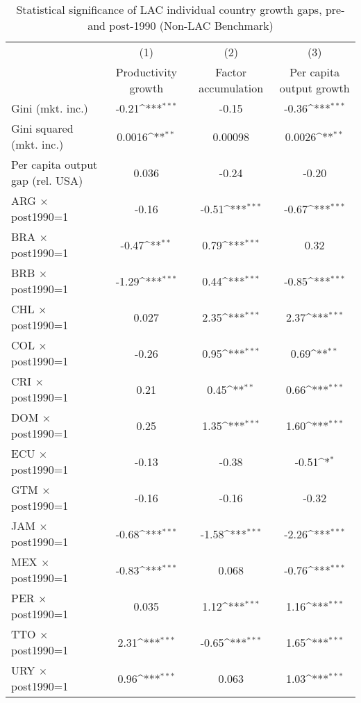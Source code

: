 \begin{table}[htbp]\centering
\def\sym#1{\ifmmode^{#1}\else\(^{#1}\)\fi}
\caption{Statistical significance of LAC individual country growth gaps, pre- and post-1990 (Non-LAC Benchmark)}
\begin{tabular}{l*{3}{c}}
\toprule
                &\multicolumn{1}{c}{(1)}&\multicolumn{1}{c}{(2)}&\multicolumn{1}{c}{(3)}\\
                &\multicolumn{1}{c}{Productivity growth}&\multicolumn{1}{c}{Factor accumulation}&\multicolumn{1}{c}{Per capita output growth}\\
\midrule
Gini (mkt. inc.)&    -0.21\sym{***}&    -0.15         &    -0.36\sym{***}\\
Gini squared (mkt. inc.)&   0.0016\sym{**} &  0.00098         &   0.0026\sym{**} \\
Per capita output gap (rel. USA)&    0.036         &    -0.24         &    -0.20         \\
ARG $\times$ post1990=1&    -0.16         &    -0.51\sym{***}&    -0.67\sym{***}\\
BRA $\times$ post1990=1&    -0.47\sym{**} &     0.79\sym{***}&     0.32         \\
BRB $\times$ post1990=1&    -1.29\sym{***}&     0.44\sym{***}&    -0.85\sym{***}\\
CHL $\times$ post1990=1&    0.027         &     2.35\sym{***}&     2.37\sym{***}\\
COL $\times$ post1990=1&    -0.26         &     0.95\sym{***}&     0.69\sym{**} \\
CRI $\times$ post1990=1&     0.21         &     0.45\sym{**} &     0.66\sym{***}\\
DOM $\times$ post1990=1&     0.25         &     1.35\sym{***}&     1.60\sym{***}\\
ECU $\times$ post1990=1&    -0.13         &    -0.38         &    -0.51\sym{*}  \\
GTM $\times$ post1990=1&    -0.16         &    -0.16         &    -0.32         \\
JAM $\times$ post1990=1&    -0.68\sym{***}&    -1.58\sym{***}&    -2.26\sym{***}\\
MEX $\times$ post1990=1&    -0.83\sym{***}&    0.068         &    -0.76\sym{***}\\
PER $\times$ post1990=1&    0.035         &     1.12\sym{***}&     1.16\sym{***}\\
TTO $\times$ post1990=1&     2.31\sym{***}&    -0.65\sym{***}&     1.65\sym{***}\\
URY $\times$ post1990=1&     0.96\sym{***}&    0.063         &     1.03\sym{***}\\

\end{tabular}
\end{table}
